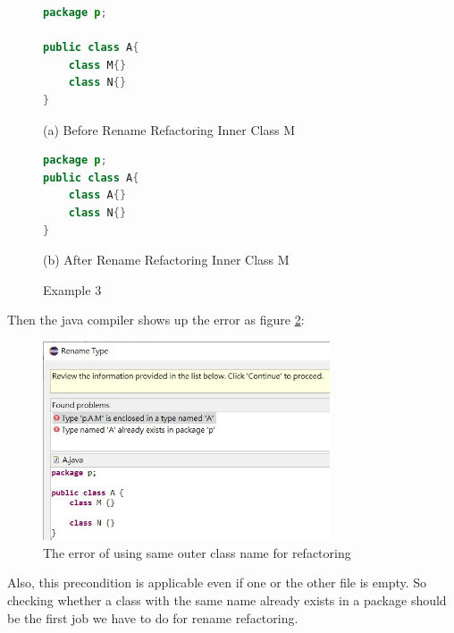 \begin{figure}[th]
\centering
\begin{minipage}[t]{0.6\linewidth}
\begin{lstlisting}[language=java, basicstyle=\scriptsize\ttfamily,frame=single]
package p;

public class A{	
    class M{}
    class N{}
} 
\end{lstlisting}
\tiny{(a) Before Rename Refactoring Inner Class M}
\end{minipage}
\hfill


\begin{minipage}[t]{0.6\linewidth}
\begin{lstlisting}[language=java, basicstyle=\scriptsize\ttfamily,frame=single]
package p;
public class A{	
    class A{}
    class N{}
} 
\end{lstlisting}
\tiny{(b) After Rename Refactoring Inner Class M}
\end{minipage}
\caption{Example 3}
\label{fig:nestedclass3}
\end{figure}

Then the java compiler shows up the error as figure \ref{fig:NC3}:

\begin{figure}[H]
\centerline{\includegraphics[width=85mm,scale=0.5]{NC3.jpg}}
\caption{The error of using same outer class name for refactoring}
\label{fig:NC3}
\end{figure}


Also, this precondition is applicable even if one or the other file is empty. So checking whether a class with the same name already exists in a package should be the first job we have to do for rename refactoring. 
   
